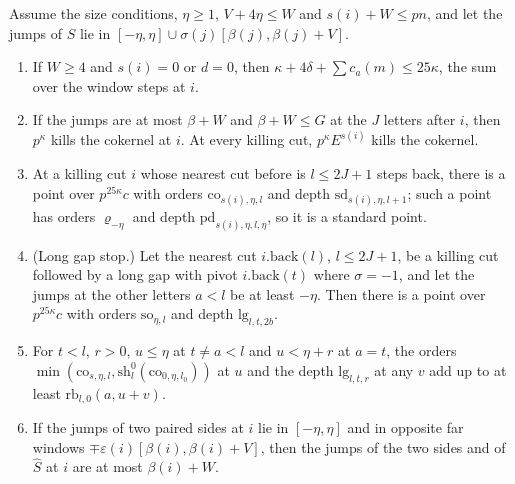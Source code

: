 \begin{lemma}\label{lem:cut-points}
Assume the size conditions, $\eta\ge1$, $V+4\eta\le W$ and $s(i)+W\le pn$, and let the jumps of $S$ lie in $[-\eta,\eta]\cup\sigma(j)[\beta(j),\beta(j)+V]$.
\begin{enumerate}[label=\textup{(\alph*)}]
\item If $W\ge4$ and $s(i)=0$ or $d=0$, then $\kappa+4\delta+\sum c_a(m)\le25\kappa$, the sum over the window steps at $i$.
\item If the jumps are at most $\beta+W$ and $\beta+W\le G$ at the $J$ letters after $i$, then $p^\kappa$ kills the cokernel at $i$. At every killing cut, $p^\kappa E^{s(i)}$ kills the cokernel.
\item At a killing cut $i$ whose nearest cut before is $l\le2J+1$ steps back, there is a point over $p^{25\kappa}c$ with orders $\mathrm{co}_{s(i),\eta,l}$ and depth $\mathrm{sd}_{s(i),\eta,l+1}$; such a point has orders $\varrho_{-\eta}$ and depth $\mathrm{pd}_{s(i),\eta,l,\eta}$, so it is a standard point.
\item (Long gap stop.) Let the nearest cut $i.\mathrm{back}(l)$, $l\le2J+1$, be a killing cut followed by a long gap with pivot $i.\mathrm{back}(t)$ where $\sigma=-1$, and let the jumps at the other letters $a<l$ be at least $-\eta$. Then there is a point over $p^{25\kappa}c$ with orders $\mathrm{so}_{\eta,l}$ and depth
$\mathrm{lg}_{l,t,2b}$.
\item For $t<l$, $r>0$, $u\le\eta$ at $t\ne a<l$ and $u<\eta+r$ at $a=t$, the orders $\min(\mathrm{co}_{s,\eta,l},\mathrm{sh}^0_l(\mathrm{co}_{0,\eta,l_0}))$ at $u$ and the depth $\mathrm{lg}_{l,t,r}$ at any $v$ add up to at least $\mathrm{rb}_{l,0}(a,u+v)$.
\item If the jumps of two paired sides at $i$ lie in $[-\eta,\eta]$ and in opposite far windows $\mp\varepsilon(i)[\beta(i),\beta(i)+V]$, then the jumps of the two sides and of $\hat S$ at $i$ are at most $\beta(i)+W$.
\end{enumerate}
\end{lemma}

